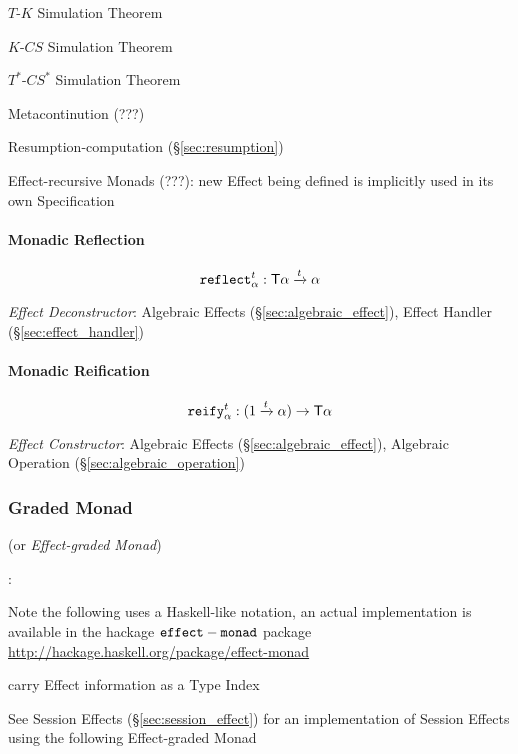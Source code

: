 $T$-$K$ Simulation Theorem

$K$-$CS$ Simulation Theorem

$T^*$-$CS^*$ Simulation Theorem

Metacontinution (???)

Resumption-computation (\S\ref{sec:resumption})

Effect-recursive Monads (???): new Effect being defined is implicitly
used in its own Specification



\paragraph{Monadic Reflection}\label{sec:monadic_reflection}\hfill
\[
  \mathtt{reflect}_\alpha^t : \mathsf{T} \alpha \xrightarrow{t} \alpha
\]

\emph{Effect Deconstructor}: Algebraic Effects
(\S\ref{sec:algebraic_effect}), Effect Handler
(\S\ref{sec:effect_handler})



\paragraph{Monadic Reification}\label{sec:monadic_reification}\hfill
\[
  \mathtt{reify}_\alpha^t : (1 \xrightarrow{t} \alpha) \rightarrow
    \mathsf{T} \alpha
\]

\emph{Effect Constructor}: Algebraic Effects
(\S\ref{sec:algebraic_effect}), Algebraic Operation
(\S\ref{sec:algebraic_operation})



\subsubsection{Graded Monad}\label{sec:graded_monad}

(or \emph{Effect-graded Monad})


\cite{orchard-yoshida16}:

\fist Note the following uses a Haskell-like notation, an actual
implementation is available in the hackage $\mathtt{effect-monad}$ package
\url{http://hackage.haskell.org/package/effect-monad}

carry Effect information as a Type Index

\fist See Session Effects (\S\ref{sec:session_effect}) for an
implementation of Session Effects using the following Effect-graded
Monad

